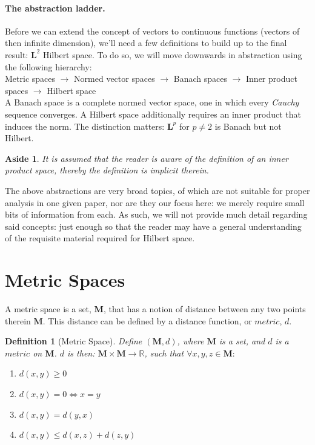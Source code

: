 \documentclass[12pt,a4paper]{report}
\theoremstyle{thms}
\newtheorem{aside}{Aside}[section]
\theoremstyle{defns}
\newtheorem{definition}{Definition}[section]
\begin{document}
\paragraph{The abstraction ladder.} Before we can extend the concept of vectors to continuous functions (vectors of then infinite dimension), we'll need a few definitions to build up to the final result: $\mathbf{L}^2$ Hilbert space. To do so, we will move downwards in abstraction using the following hierarchy:\\
Metric spaces $\rightarrow$ Normed vector spaces $\rightarrow$ Banach spaces $\rightarrow$ Inner product spaces $\rightarrow$ Hilbert space\\
A Banach space is a complete normed vector space, one in which every \textit{Cauchy} sequence converges. A Hilbert space additionally requires an inner product that induces the norm. The distinction matters: $\mathbf{L}^p$ for $p \neq 2$ is Banach but not Hilbert.

\begin{aside}
    It is assumed that the reader is aware of the definition of an inner product space, thereby the definition is implicit therein.
\end{aside}

The above abstractions are very broad topics, of which are not suitable for proper analysis in one given paper, nor are they our focus here: we merely require small bits of information from each. As such, we will not provide much detail regarding said concepts: just enough so that the reader may have a general understanding of the requisite material required for Hilbert space.

\section{Metric Spaces}
A metric space is a set, $\mathbf{M}$, that has a notion of distance between any two points therein $\mathbf{M}$. This distance can be defined by a distance function, or $\mathit{metric}$, $d$.

\begin{definition}[Metric Space]
    Define $(\mathbf{M}, d)$, where  $\mathbf{M}$ is a set, and $d$ is a $\mathit{metric}$ on $\mathbf{M}$. $d$ is then:  $\mathbf{M} \times \mathbf{M} \rightarrow \mathbb{R}$, such that $\forall x, y, z \in \mathbf{M}:$

    \begin{enumerate}
        \item $d(x, y) \geq 0$
        \item $d(x, y) = 0 \iff x = y$
        \item $d(x, y) = d(y, x)$
        \item $d(x, y) \leq d(x, z) + d(z, y)$
    \end{enumerate}
\end{definition}
\end{document}
